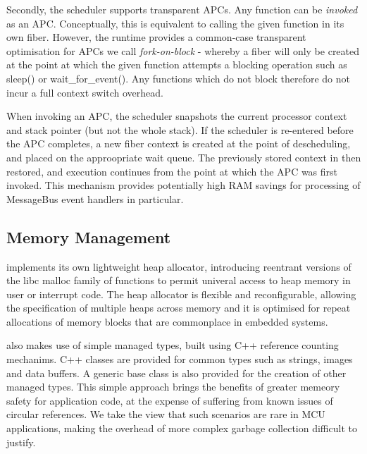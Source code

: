 Secondly, the \CO scheduler supports transparent APCs. Any function can be \emph{invoked} as an APC. Conceptually, this is equivalent to calling the given function in its own fiber. However, the \CO runtime provides a common-case transparent optimisation for APCs we call \emph{fork-on-block} - whereby a fiber will only be created at the point at which the given function attempts a blocking operation such as sleep() or wait\_for\_event(). Any functions which do not block therefore do not incur a full context switch overhead. 

When invoking an APC, the scheduler snapshots the current processor context and stack pointer (but not the whole stack). If the scheduler is re-entered before the APC completes, a new fiber context is created at the point of descheduling, and placed on the approopriate wait queue. The previously stored context in then restored, and execution continues from the point at which the APC was first invoked. This mechanism provides potentially high RAM savings for processing of MessageBus event handlers in particular.

\subsection{Memory Management}
\CO implements its own lightweight heap allocator, introducing reentrant versions of the libc malloc family of functions to permit univeral access to heap memory in user or interrupt code. The heap allocator is flexible and reconfigurable, allowing the specification of multiple heaps across memory and it is optimised for repeat allocations of memory blocks that are commonplace in embedded systems.

\CO also makes use of simple managed types, built using C++ reference counting mechanims. C++ classes are provided for common types such as strings, images and data buffers. A generic base class is also provided for the creation of other managed types. This simple approach brings the benefits of greater memeory safety for application code, at the expense of suffering from known issues of circular references. We take the view that such scenarios are rare in MCU applications, making the overhead of more complex garbage collection difficult to justify.

